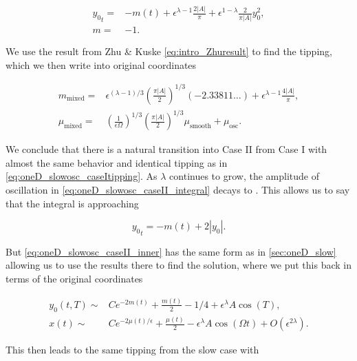 \begin{equation}\label{eq:oneD_slowosc_caseII_taylor}
\begin{aligned}
{y_0}_t=&-m(t)+\epsilon^{\lambda-1}\frac{2|A|}{\pi}+\epsilon^{1-\lambda}\frac{2}{\pi |A|}y_0^2,\\
m=&-1.
\end{aligned}
\end{equation}

We use the result from Zhu \& Kuske \eqref{eq:intro_Zhuresult} to find the tipping, which we then write into original coordinates

\begin{equation*}
\begin{aligned}
m_{\text{mixed}}=&\epsilon^{(\lambda-1)/3}\left(\frac{\pi |A|}{2}\right)^{1/3}(-2.33811\ldots)+\epsilon^{\lambda-1}\frac{4|A|}{\pi},\\
\mu_{\text{mixed}}=&\left(\frac{1}{\epsilon\Omega}\right)^{1/3}\left(\frac{\pi |A|}{2}\right)^{1/3} \mu_{\text{smooth}}+\mu_{\text{osc}}.
\end{aligned}
\end{equation*}

We conclude that there is a natural transition into Case II from Case I with almost the same behavior and identical tipping as in \eqref{eq:oneD_slowosc_caseItipping}. As $\lambda$ continues to grow, the amplitude of oscillation in \eqref{eq:oneD_slowosc_caseII_integral} decays to . This allows us to say that the integral is approaching

\begin{equation}\label{eq:oneD_slowosc_caseII_inner}
{y_0}_t = -m(t) +2|y_0|.
\end{equation}

But \eqref{eq:oneD_slowosc_caseII_inner} has the same form as in \autoref{sec:oneD_slow} allowing us to use the results there to find the solution, where we put this back in terms of the original coordinates

\begin{equation}\label{eq:oneD_slowosc_caseIIsoln}
\begin{aligned}
y_0(t,T)\sim& C e^{-2m(t)}+\frac{m(t)}{2}-1/4 +\epsilon^\lambda A\cos(T),\\
x(t)\sim& C e^{-2\mu(t)/\epsilon}+\frac{\mu(t)}{2} -\epsilon^\lambda A\cos(\Omega t)+O(\epsilon^{2\lambda}).
\end{aligned}
\end{equation}

This then leads to the same tipping from the slow case with 


